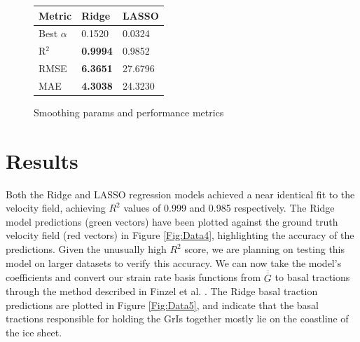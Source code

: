 \documentclass{article}
\begin{document}
\begin{figure}[!htb]
   \begin{minipage}{0.33\textwidth}
    \centering
     \begin{tabular}{l|l|l}
        \textbf{Metric} & \textbf{Ridge} & \textbf{LASSO} \\
        \hline
        Best $\alpha$ & 0.1520 & 0.0324 \\
        R$^{2}$ & \textbf{0.9994} & 0.9852 \\
        RMSE & \textbf{6.3651} & 27.6796 \\
        MAE & \textbf{4.3038} & 24.3230 \\
    \end{tabular}
    \caption{Smoothing params and performance metrics}\label{Fig:Data1c}
  \end{minipage}
\end{figure}

\section{Results}

Both the Ridge and LASSO regression models achieved a near identical fit to the velocity field, achieving $R^{2}$ values of 0.999 and 0.985 respectively. The Ridge model predictions (green vectors) have been plotted against the ground truth velocity field (red vectors) in Figure \ref{Fig:Data4}, highlighting the accuracy of the predictions. Given the unusually high $R^{2}$ score, we are planning on testing this model on larger datasets to verify this accuracy. We can now take the model's coefficients and convert our strain rate basis functions from $\overline{\overline{G}}$ to basal tractions through the method described in Finzel et al. \cite{finzel_surface_2015}. The Ridge basal traction predictions are plotted in Figure \ref{Fig:Data5}, and indicate that the basal tractions responsible for holding the GrIs together mostly lie on the coastline of the ice sheet.

\end{document}
